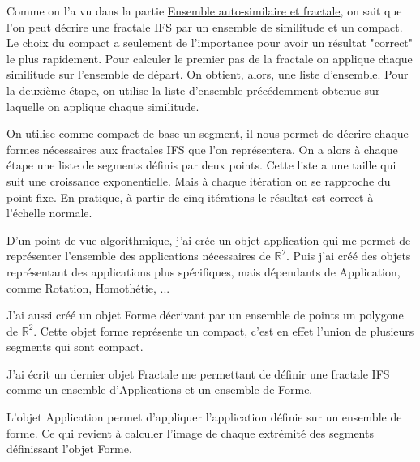 \documentclass[a4paper, 12pt]{report}
\begin{document}
			Comme on l'a vu dans la partie \hyperref[FracEns]{Ensemble auto-similaire et fractale}, on sait que l'on peut décrire une fractale IFS par un ensemble de similitude et un compact. 
			Le choix du compact a seulement de l'importance pour avoir un résultat "correct" le plus rapidement. Pour calculer le premier pas de la fractale on applique chaque similitude sur l'ensemble de départ. On obtient, alors, une liste d'ensemble. Pour la deuxième étape, on utilise la liste d'ensemble précédemment obtenue sur laquelle on applique chaque similitude.
			
			
			\vspace{.2 cm}\hspace{.7 cm}
			On utilise comme compact de base un segment, il nous permet de décrire chaque formes nécessaires aux fractales IFS que l'on représentera. On a alors à chaque étape une liste de segments définis par deux points. Cette liste a une taille qui suit une croissance exponentielle. Mais à chaque itération on se rapproche du point fixe. En pratique, à partir de cinq itérations le résultat est correct à l'échelle normale.
			
			\vspace{.2 cm}\hspace{.7 cm}
			D'un point de vue algorithmique, j'ai crée un objet application qui me permet de représenter l'ensemble des applications nécessaires de $\mathds{R}^2$. Puis j'ai créé des objets représentant des applications plus spécifiques, mais dépendants de Application, comme Rotation, Homothétie, ...
			
			\vspace{.2 cm}\hspace{.7 cm}
			J'ai aussi créé un objet Forme décrivant par un ensemble de points un polygone de $\mathds{R}^2$. Cette objet forme représente un compact, c'est en effet l'union de plusieurs segments qui sont compact.
			
			\vspace{.2 cm}\hspace{.7 cm}
			J'ai écrit un dernier objet Fractale me permettant de définir une fractale IFS comme un ensemble d'Applications et un ensemble de Forme.
			
			\vspace{.2 cm}\hspace{.7 cm}
			L'objet Application permet d'appliquer l'application définie sur un ensemble de forme. Ce qui revient à calculer l'image de chaque extrémité des segments définissant l'objet Forme.
	
\end{document}
